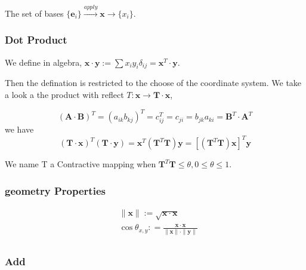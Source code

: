 The set of bases $\{ \boldsymbol e_i  \}  \stackrel{apply}{\longrightarrow} \boldsymbol{x} \longrightarrow    \{ x_i \}   $.




\subsubsection{Dot Product}

We define in algebra, $ \boldsymbol{x} \cdot \boldsymbol{y} := \sum{x_iy_i \delta _{ij}} = \boldsymbol{x}^T \cdot \boldsymbol{y}$.

Then the defination is restricted to the choose of the coordinate system. We take a look a the product with reflect $T : \boldsymbol x \rightarrow  \boldsymbol{T} \cdot \boldsymbol{x}$,

\begin{equation}
    (\boldsymbol A \cdot \boldsymbol  B)^T = (a_{ik}b_{kj})^T = c_{ij}^T = c_{ji} = b_{jk}a_{ki} = \boldsymbol B^T \cdot \boldsymbol A^T
\end{equation}
we have 
\begin{equation}
    (\boldsymbol T \cdot \boldsymbol  x)^T(\boldsymbol T \cdot \boldsymbol  y) =  \boldsymbol x^T (\boldsymbol T^T \boldsymbol T) \boldsymbol y = [(\boldsymbol T^T \boldsymbol T) \boldsymbol x]^T \boldsymbol y
\end{equation}

We name T a Contractive mapping when $\boldsymbol T^T \boldsymbol T \leqslant   \theta, 0 \leqslant \theta \leqslant 1$.

\subsubsection{geometry Properties}

\begin{equation}
    \begin{split}
    &\parallel \boldsymbol{x} \parallel := \sqrt{\boldsymbol x \cdot \boldsymbol x}\\
    &\cos {\theta_{x,y}} : = \frac
    {\boldsymbol x \cdot \boldsymbol x}
    {\parallel \boldsymbol{x} \parallel \cdot \parallel \boldsymbol{y} \parallel}\\
\end{split}
\end{equation}

\subsubsection{Add}

